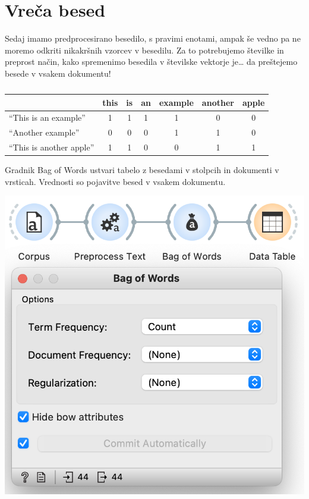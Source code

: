 \chapter{Vreča besed}
\label{ch:vreca-besed}

Sedaj imamo predprocesirano besedilo, s pravimi enotami, ampak še vedno pa ne moremo odkriti nikakršnih vzorcev v besedilu. Za to potrebujemo številke in preprost način, kako spremenimo besedila v številske vektorje je… da preštejemo besede v vsakem dokumentu!

\begin{table}
    \begin{tabular}{ l c c c c c c }
        \hline
         &this&is&an&example&another&apple\\
         \hline
        ``This is an example'' & 1 & 1 & 1 & 1 & 0 & 0 \\ 
        ``Another example'' & 0 & 0 & 0 & 1 & 1 & 0 \\
        ``This is another apple'' & 1 & 1 & 0 & 0 & 1 & 1\\
        \hline
    \end{tabular}
    \caption{ }
\end{table}

Gradnik Bag of Words ustvari tabelo z besedami v stolpcih in dokumenti v vrsticah. Vrednosti so pojavitve besed v vsakem dokumentu.

\begin{marginfigure}[3cm]
    \includegraphics[width=\linewidth]{vreca-besed-workflow.png}
    \caption{}
\end{marginfigure}

